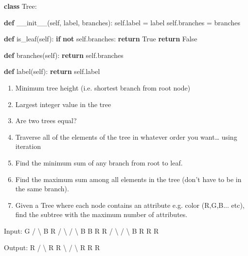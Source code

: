 \documentclass[11pt]{article}
\providecommand{\tightlist}{%
      \setlength{\itemsep}{0pt}\setlength{\parskip}{0pt}}
\newenvironment{Shaded}{}{}
\newcommand{\KeywordTok}[1]{\textcolor[rgb]{0.00,0.44,0.13}{\textbf{{#1}}}}
\newcommand{\FunctionTok}[1]{\textcolor[rgb]{0.02,0.16,0.49}{{#1}}}
\newcommand{\NormalTok}[1]{{#1}}
\newcommand{\VariableTok}[1]{\textcolor[rgb]{0.10,0.09,0.49}{{#1}}}
\newcommand{\ControlFlowTok}[1]{\textcolor[rgb]{0.00,0.44,0.13}{\textbf{{#1}}}}
\newcommand{\OperatorTok}[1]{\textcolor[rgb]{0.40,0.40,0.40}{{#1}}}
\begin{document}
\begin{Shaded}
\begin{Highlighting}[]
\KeywordTok{class}\NormalTok{ Tree:}
    
    \KeywordTok{def} \FunctionTok{__init__}\NormalTok{(}\VariableTok{self}\NormalTok{, label, branches):}
        \VariableTok{self}\NormalTok{.label }\OperatorTok{=}\NormalTok{ label}
        \VariableTok{self}\NormalTok{.branches }\OperatorTok{=}\NormalTok{ branches}

    \KeywordTok{def}\NormalTok{ is_leaf(}\VariableTok{self}\NormalTok{):}
        \ControlFlowTok{if} \KeywordTok{not} \VariableTok{self}\NormalTok{.branches:}
            \ControlFlowTok{return} \VariableTok{True}
        \ControlFlowTok{return} \VariableTok{False}

    \KeywordTok{def}\NormalTok{ branches(}\VariableTok{self}\NormalTok{):}
        \ControlFlowTok{return} \VariableTok{self}\NormalTok{.branches}

    \KeywordTok{def}\NormalTok{ label(}\VariableTok{self}\NormalTok{):}
        \ControlFlowTok{return} \VariableTok{self}\NormalTok{.label}
\end{Highlighting}
\end{Shaded}

\begin{enumerate}
\def\labelenumi{\arabic{enumi}.}
\tightlist
\item
  Minimum tree height (i.e. shortest branch from root node)
\item
  Largest integer value in the tree
\item
  Are two trees equal?
\item
  Traverse all of the elements of the tree in whatever order you
  want\ldots{} using iteration
\item
  Find the minimum sum of any branch from root to leaf.
\item
  Find the maximum sum among all elements in the tree (don't have to be
  in the same branch).
\item
  Given a Tree where each node contains an attribute e.g. color
  (R,G,B... etc), find the subtree with the maximum number of
  attributes.
\end{enumerate}

\begin{Shaded}
\begin{Highlighting}[]
\NormalTok{Input: }
\NormalTok{G }
\OperatorTok{/} \OperatorTok{\textbackslash{}} 
\NormalTok{B  R }
\OperatorTok{/} \OperatorTok{\textbackslash{}} \OperatorTok{/} \OperatorTok{\textbackslash{}} 
\NormalTok{B B R R }
\OperatorTok{/} \OperatorTok{\textbackslash{}} \OperatorTok{/} \OperatorTok{\textbackslash{}} 
\NormalTok{B R R R }

\NormalTok{Output: }
\NormalTok{R }
\OperatorTok{/} \OperatorTok{\textbackslash{}} 
\NormalTok{R R }
\OperatorTok{\textbackslash{}} \OperatorTok{/} \OperatorTok{\textbackslash{}} 
\NormalTok{R R R}
\end{Highlighting}
\end{Shaded}


    
    
    
    
\end{document}

